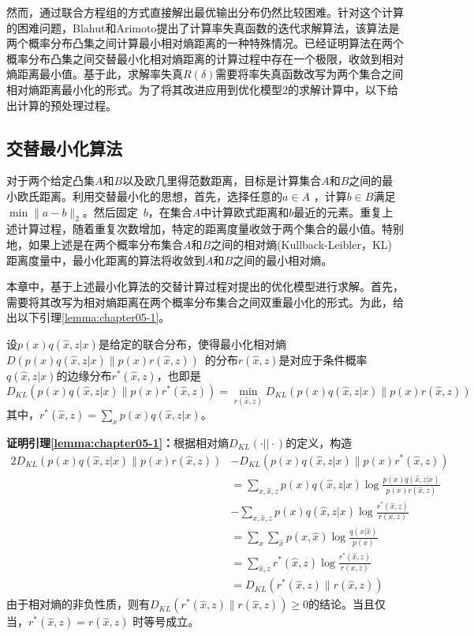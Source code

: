 然而，通过联合方程组的方式直接解出最优输出分布仍然比较困难。针对这个计算的困难问题，Blahut和Arimoto\cite{arimoto1972an,blahut1972computation}提出了计算率失真函数的迭代求解算法，该算法是两个概率分布凸集之间计算最小相对熵距离的一种特殊情况\cite{cover2006elements}。已经证明算法在两个概率分布凸集之间交替最小化相对熵距离的计算过程中存在一个极限，收敛到相对熵距离最小值。基于此，求解率失真$R(\delta)$需要将率失真函数改写为两个集合之间相对熵距离最小化的形式。为了将其改进应用到优化模型$2$的求解计算中，以下给出计算的预处理过程。

\subsection{交替最小化算法}
对于两个给定凸集$A$和$B$以及欧几里得范数距离，目标是计算集合$A$和$B$之间的最小欧氏距离。利用交替最小化的思想，首先，选择任意的$a \in A$ ，计算$b \in B$满足~$\min \parallel a-b\parallel_{2}$。然后固定~$b$，在集合$A$中计算欧式距离和$b$最近的元素。重复上述计算过程，随着重复次数增加，特定的距离度量收敛于两个集合的最小值\cite{cover2006elements}。特别地，如果上述是在两个概率分布集合$A$和$B$之间的相对熵(Kullback-Leibler，KL) 距离度量中，最小化距离的算法将收敛到$A$和$B$之间的最小相对熵\cite{csiszar1984information}。

本章中，基于上述最小化算法的交替计算过程对提出的优化模型进行求解。首先，需要将其改写为相对熵距离在两个概率分布集合之间双重最小化的形式。为此，给出以下引理\ref{lemma:chapter05-1}。
\begin{lemma}\label{lemma:chapter05-1}设$p(x)q(\hat{x},z|x)$是给定的联合分布，使得最小化相对熵$D(p(x)q(\hat{x},z|x)\parallel p(x)r(\hat{x},z))$~的分布$r(\hat{x},z)$是对应于条件概率$q(\hat{x},z|x)$的边缘分布$r^*(\hat{x},z)$，也即是
	\begin{equation}\label{lemma5.1}
		D_{KL}(p(x)q(\hat{x},z|x)\parallel p(x)r^*(\hat{x},z))=\min_{r(\hat{x},z)}D_{KL}(p(x)q(\hat{x},z|x)\parallel p(x)r(\hat{x},z))
	\end{equation}
	其中，$r^*(\hat{x},z)=\sum_{x}p(x)q(\hat{x},z|x)$。
\end{lemma}
\textbf{证明引理\ref{lemma:chapter05-1}：}根据相对熵$D_{KL}(\cdot||\cdot)$的定义，构造
\begin{alignat}{2}
	D_{KL}\left( p(x)q(\hat{x},z|x)\parallel p(x)r(\hat{x},z)\right)
	 & -D_{KL}\left(p(x)q(\hat{x},z|x)\parallel p(x)r^{*}(\hat{x},z)\right) \\
	 & =\sum_{x,\hat{x},z}p(x)q(\hat{x},z|x)\log \frac{p(x)q(\hat{x},z|x)}{p(x)r(\hat{x},z)}\\
	 & - \sum_{x,\hat{x},z}p(x)q(\hat{x},z|x)\log \frac{r^*(\hat{x},z)}{r(x,z)}\\
	 & = \sum_{x}\sum_{\hat{x}}p(x,\hat{x})\log \frac{q(x|\hat{x})}{p(x)} \nonumber \\
	 &=\sum_{\hat{x},z}r^*(\hat{x},z)\log \frac{r^*(\hat{x},z)}{r(x,z)}\\
	 & =D_{KL}\left(r^*(\hat{x},z)\parallel r(\hat{x},z)\right)
\end{alignat}
由于相对熵的非负性质，则有$D_{KL}\left(r^*(\hat{x},z)\parallel r(\hat{x},z)\right)\geq 0$的结论。当且仅当，$r^*(\hat{x},z)= r(\hat{x},z)$ 时等号成立。

